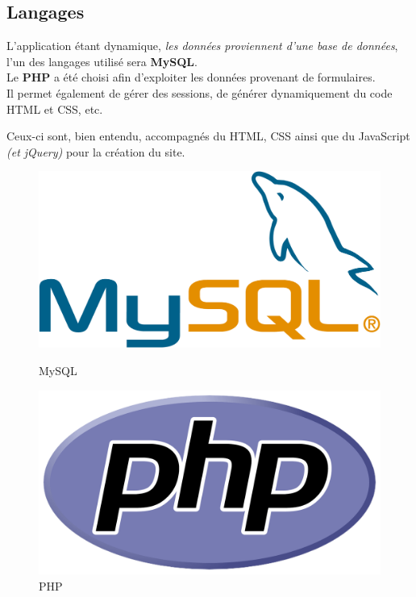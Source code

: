 \newpage

\subsection{Langages}
\label{subsec:languages}
L'application étant dynamique, \textit{les données proviennent d'une base de données}, l'un des langages utilisé sera \textbf{MySQL}.\\
Le \textbf{PHP} a été choisi afin d'exploiter les données provenant de formulaires. \\Il permet également de gérer des sessions, de générer dynamiquement du code HTML et CSS, etc.

Ceux-ci sont, bien entendu, accompagnés du HTML, CSS ainsi que du JavaScript \textit{(et jQuery)} pour la création du site.

\vspace{1cm}

\begin{figure}[!h]
    \centering
    \begin{minipage}[c]{0.4\textwidth}
        \centering
        \includegraphics[scale=0.15]
        {textures/images/tools/mysql.pdf}
        \caption{MySQL}\label{fig:mysql}
    \end{minipage} \qquad
    \begin{minipage}[c]{0.4\textwidth}
        \centering
        \includegraphics[scale=0.15]
        {textures/images/tools/php.pdf}
        \caption{PHP}\label{fig:php}
    \end{minipage}
\end{figure}

